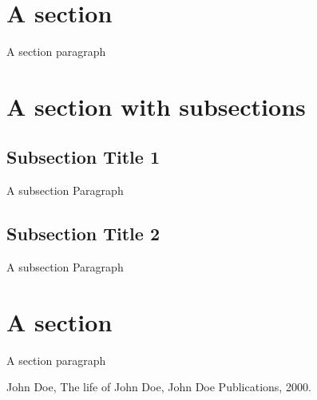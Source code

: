 \documentclass[12pt,a4paper,oneside]{book}
\renewcommand{\headrulewidth}{0pt}
\renewcommand{\headrulewidth}{0pt}
\begin{document}
\section*{A section}
\indent A section paragraph


\section*{A section with subsections}
\subsection*{Subsection Title 1}

\indent A subsection Paragraph


\subsection*{Subsection Title 2}

\indent A subsection Paragraph

\section*{A section}

\indent A section paragraph





\begin{thebibliography}{0}
\renewcommand{\headrulewidth}{0pt}
\fancyhead{}
\markboth{}{}{}

John Doe, The life of John Doe, John Doe Publications, 2000.

\end{thebibliography}
\pagebreak\centering\setlength{\parindent}{10pt}
\tableofcontents
\end{document}
